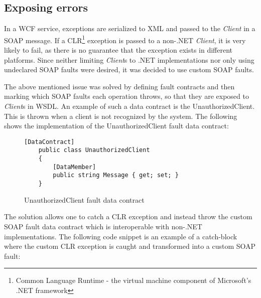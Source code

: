 \documentclass[../report.tex]{subfiles}
\begin{document}
\subsection{Exposing errors}
In a WCF service, exceptions are serialized to XML and passed to the \textit{Client} in a SOAP message. If a CLR\footnote{Common Language Runtime - the virtual machine component of Microsoft's .NET framework} exception is passed to a non-.NET \textit{Client}, it is very likely to fail, as there is no guarantee that the exception exists in different platforms. Since neither limiting \textit{Client}s to .NET implementations nor only using undeclared SOAP faults were desired, it was decided to use custom SOAP faults.

The above mentioned issue was solved by defining fault contracts and then marking which SOAP faults each operation throws, so that they are exposed to \textit{Client}s in WSDL. An example of such a data contract is the UnauthorizedClient. This is thrown when a client is not recognized by the system. The following shows the implementation of the UnauthorizedClient fault data contract:


\begin{figure}[H]
\begin{lstlisting}[frame=tb]
    [DataContract]
    public class UnauthorizedClient
    {
        [DataMember]
        public string Message { get; set; }
    }
\end{lstlisting}
\caption{UnauthorizedClient fault data contract}
\end{figure}



The solution allows one to catch a CLR exception and instead throw the custom SOAP fault data contract which is interoperable with non-.NET implementations. The following code snippet is an example of a catch-block where the custom CLR exception is caught and transformed into a custom SOAP fault:
\end{document}
